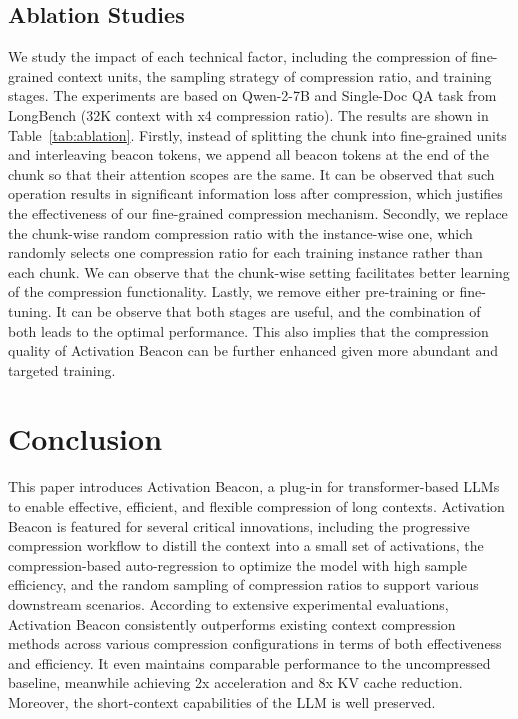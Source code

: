 \subsection{Ablation Studies}
\label{sec:exp-ablation}

We study the impact of each technical factor, including the compression of fine-grained context units, the sampling strategy of compression ratio, and training stages. The experiments are based on Qwen-2-7B and Single-Doc QA task from LongBench  (32K context with x4 compression ratio). The results are shown in Table~\ref{tab:ablation}.
Firstly, instead of splitting the chunk into fine-grained units and interleaving beacon tokens, we append all beacon tokens at the end of the chunk so that their attention scopes are the same. It can be observed that such operation results in significant information loss after compression, which justifies the effectiveness of our fine-grained compression mechanism. Secondly, we replace the chunk-wise random compression ratio with the instance-wise one, which randomly selects one compression ratio for each training instance rather than each chunk. We can observe that the chunk-wise setting facilitates better learning of the compression functionality. Lastly, we remove either pre-training or fine-tuning. It can be observe that both stages are useful, and the combination of both leads to the optimal performance. This also implies that the compression quality of Activation Beacon can be further enhanced given more abundant and targeted training.

\section{Conclusion}

This paper introduces Activation Beacon, a plug-in for transformer-based LLMs to enable effective, efficient, and flexible compression of long contexts. Activation Beacon is featured for several critical innovations, including the progressive compression workflow to distill the context into a small set of activations, the compression-based auto-regression to optimize the model with high sample efficiency, and the random sampling of compression ratios to support various downstream scenarios. According to extensive experimental evaluations, Activation Beacon consistently outperforms existing context compression methods across various compression configurations in terms of both effectiveness and efficiency. It even maintains comparable performance to the uncompressed baseline, meanwhile achieving 2x acceleration and 8x KV cache reduction. Moreover, the short-context capabilities of the LLM is well preserved.



